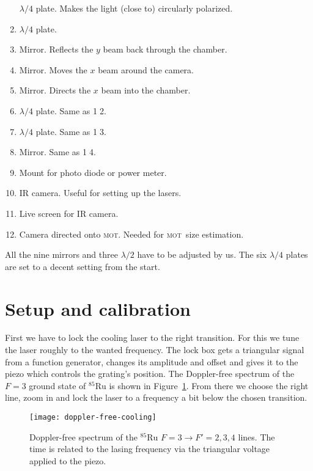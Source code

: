 \documentclass[11pt, english, fleqn, DIV=15, headinclude, BCOR=2cm]{scrreprt}
\newcommand\mot{\textsc{mot}}
\begin{document}
\begin{enumerate}
        $\lambda/4$ plate. Makes the light (close to) circularly polarized.
    \item
        $\lambda/4$ plate.
    \item
        Mirror. Reflects the $y$ beam back through the chamber.
    \item
        Mirror. Moves the $x$ beam around the camera.
    \item
        Mirror. Directs the $x$ beam into the chamber.
    \item
        $\lambda/4$ plate. Same as \textcircled{12}.
    \item
        $\lambda/4$ plate. Same as \textcircled{13}.
    \item
        Mirror. Same as \textcircled{14}.
    \item
        Mount for photo diode or power meter.
    \item
        IR camera. Useful for setting up the lasers.
    \item
        Live screen for IR camera.
    \item
        Camera directed onto \mot. Needed for \mot\ size estimation.
\end{enumerate}

All the nine mirrors and three $\lambda/2$ have to be adjusted by us. The
six $\lambda/4$ plates are set to a decent setting from the start.

\section{Setup and calibration}

First we have to lock the cooling laser to the right transition. For this we
tune the laser roughly to the wanted frequency. The lock box gets a triangular
signal from a function generator, changes its amplitude and offset and gives it
to the piezo which controls the grating's position. The Doppler-free spectrum of
the $F=3$ ground state of ${}^{85}\text{Ru}$ is shown in
Figure~\ref{fig:doppler-free-cooling}. From there we choose the right line,
zoom in and lock the laser to a frequency a bit below the chosen transition. 

\begin{figure}
    \centering
    \texttt{[image: doppler-free-cooling]}
    \caption{%
        Doppler-free spectrum of the ${}^{85}\text{Ru}$ $F=3 \to F'=2,3,4$
        lines. The time is related to the lasing frequency via the triangular
        voltage applied to the piezo.
    }
    \label{fig:doppler-free-cooling}
\end{figure}
\end{document}
